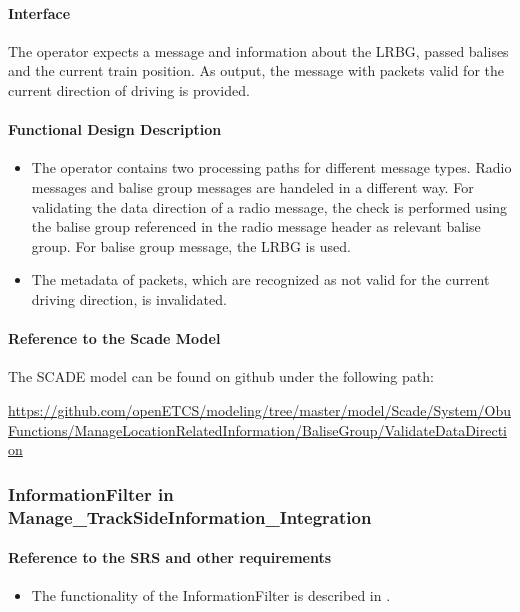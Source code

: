 \paragraph{Interface}
The operator expects a message and information about the LRBG, passed balises and the current train position. As output, the message with packets valid for the current direction of driving is provided.
\paragraph{Functional Design Description}
\begin{itemize}
 \item The operator contains two processing paths for different message types. Radio messages and balise group messages are handeled in a different way. For validating the data direction of a radio message, the check is performed using the balise group referenced in the radio message header as relevant balise group. For balise group message, the LRBG is used.
 \item The metadata of packets, which are recognized as not valid for the current driving direction, is invalidated.
\end{itemize}

\paragraph{Reference to the Scade Model}
The SCADE model can be found on github under the following path:

\tiny\url{https://github.com/openETCS/modeling/tree/master/model/Scade/System/ObuFunctions/ManageLocationRelatedInformation/BaliseGroup/ValidateDataDirection}
\normalsize

\subsubsection{InformationFilter in Manage\_TrackSideInformation\_Integration}

\paragraph{Reference to the SRS and other requirements}
\begin{itemize}
 \item The functionality of the InformationFilter is described in \cite[Chapter~4.8]{subset-026}.
\end{itemize}

